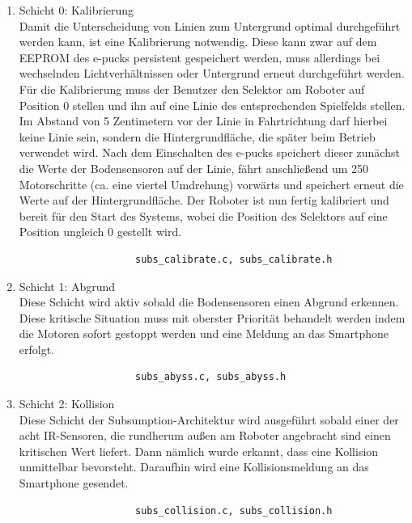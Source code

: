 \documentclass[10pt,a4paper]{article}
\begin{document}
			\begin{enumerate}
  				\item Schicht 0: Kalibrierung \\
					Damit die Unterscheidung von Linien zum Untergrund optimal durchgeführt werden kann, ist eine Kalibrierung notwendig. Diese kann
					zwar auf dem EEPROM des e-pucks persistent gespeichert werden, muss allerdings bei wechselnden Lichtverhältnissen oder Untergrund
					erneut durchgeführt werden. \\
					Für die Kalibrierung muss der Benutzer den Selektor am Roboter auf Position 0 stellen und ihn auf eine Linie des entsprechenden
					Spielfelds stellen. Im Abstand von 5 Zentimetern vor der Linie in Fahrtrichtung darf hierbei keine Linie sein, sondern die
					Hintergrundfläche, die später beim Betrieb verwendet wird. Nach dem Einschalten des e-pucks speichert dieser zunächst die Werte der
					Bodensensoren auf der Linie, fährt anschließend um 250 Motorschritte (ca. eine viertel Umdrehung) vorwärts und speichert erneut
					die Werte auf der Hintergrundfläche. Der Roboter ist nun fertig kalibriert und bereit für den Start des Systems, wobei die Position des
					Selektors auf eine Position ungleich 0 gestellt wird.

					\begin{verbatim} 
					subs_calibrate.c, subs_calibrate.h
					\end{verbatim}			
			
  				\item Schicht 1: Abgrund \\
					Diese Schicht wird aktiv sobald die Bodensensoren einen Abgrund erkennen. Diese kritische Situation muss mit oberster 
					Priorität behandelt werden indem die Motoren sofort gestoppt werden und eine Meldung an das Smartphone erfolgt.

					\begin{verbatim} 
					subs_abyss.c, subs_abyss.h
					\end{verbatim}

  				\item Schicht 2: Kollision \\
					Diese Schicht der Subsumption-Architektur wird ausgeführt sobald einer der acht IR-Sensoren, die rundherum außen am Roboter 
					angebracht sind einen kritischen Wert liefert. Dann nämlich wurde erkannt, dass eine Kollision unmittelbar bevorsteht. Daraufhin wird
					eine Kollisionsmeldung an das Smartphone gesendet.

					\begin{verbatim}  
					subs_collision.c, subs_collision.h
					\end{verbatim}


\end{enumerate}
\end{document}

